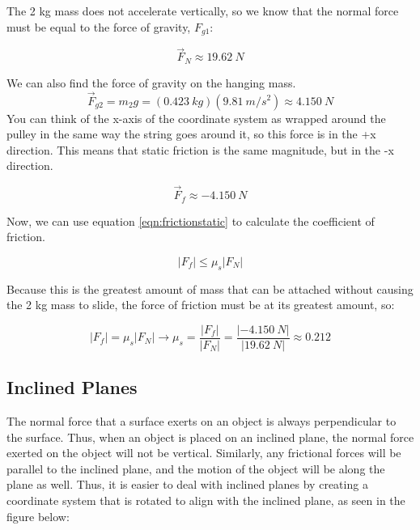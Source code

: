 \begin{mdframed}[backgroundcolor=blue!10!white]
		The 2 kg mass does not accelerate vertically, so we know that the normal force must be equal to the force of gravity, $F_{g1}$:
		
		\begin{equation*}
			\vec{F}_N \approx \SI{19.62}{N}
		\end{equation*}
		
		We can also find the force of gravity on the hanging mass.  
			\begin{equation*}
			\vec{F}_{g2} = m_2 g = (\SI{0.423}{kg})(\SI{9.81}{m/s^2}) \approx \SI{4.150}{N}
		\end{equation*}
		You can think of the x-axis of the coordinate system as wrapped around the pulley in the same way the string goes around it, so this force is in the +x direction.  This means that static friction is the same magnitude, but in the -x direction.
		
			\begin{equation*}
			\vec{F}_f \approx \SI{-4.150}{N}
		\end{equation*}
		 
		 Now, we can use equation \ref{eqn:frictionstatic} to calculate the coefficient of friction.  
		 
		 	\begin{equation*}
		 	|F_f| \leq \mu_s |F_N|  
		 \end{equation*}
		 
		 Because this is the greatest amount of mass that can be attached without causing the 2 kg mass to slide, the force of friction must be at its greatest amount, so:
		 
		 \begin{equation*}
		 	|F_f| = \mu_s |F_N|  \longrightarrow \mu_s = \frac{|F_f|}{|F_N|} = \frac{|\SI{-4.150}{N}|}{|\SI{19.62}{N}|} \approx 0.212
		 \end{equation*}
		 
		
	\end{mdframed}	
	
	
	\newpage
		
		\subsection{Inclined Planes}
		 The normal force that a surface exerts on an object is always perpendicular to the surface.  Thus, when an object is placed on an inclined plane, the normal force exerted on the object will not be vertical.  Similarly, any frictional forces will be parallel to the inclined plane, and the motion of the object will be along the plane as well.  Thus, it is easier to deal with inclined planes by creating a coordinate system that is rotated to align with the inclined plane, as seen in the figure below:
		
